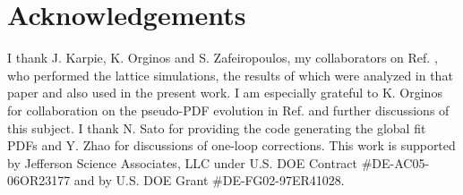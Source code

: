 \section*{Acknowledgements}

I thank J. Karpie, K. Orginos and S. Zafeiropoulos,
my collaborators on  Ref. \cite{Orginos:2017kos},
who performed the
lattice simulations,   the  results of which  were  analyzed in that paper
and also  used    in the present work.
I am  especially  grateful to
K. Orginos for  collaboration on  the pseudo-PDF evolution
in Ref.  \cite{Orginos:2017kos} and further discussions of this subject.
I thank  N. Sato
for  providing the code generating
the global fit PDFs  and Y. Zhao for discussions of one-loop corrections.
This work is supported by Jefferson Science Associates,
LLC under  U.S. DOE Contract \#DE-AC05-06OR23177
and  by U.S. DOE Grant   \mbox{\#DE-FG02-97ER41028. }


